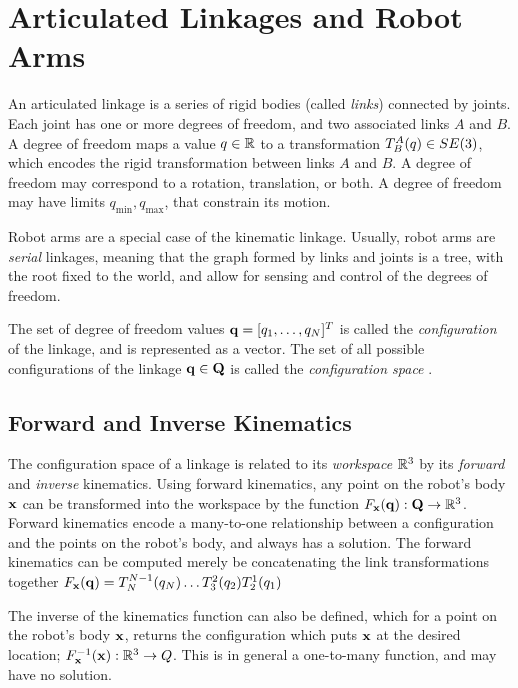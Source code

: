 \section{Articulated Linkages and Robot Arms}
\label{sec:articulated_linkage}
An articulated linkage is a series of rigid bodies (called \textit{links}) connected by joints. Each joint has one or more degrees of freedom, and two associated links $A$ and $B$. A degree of freedom maps a value $q \in \mathbb{R}$ to a transformation $T^{A}_B(q) \in SE(3)$, which encodes the rigid transformation between links $A$ and $B$. A degree of freedom may correspond to a rotation, translation, or both. A degree of freedom may have limits $q_\text{min}, q_\text{max}$, that constrain its motion.

Robot arms are a special case of the kinematic linkage. Usually, robot arms are \textit{serial} linkages, meaning that the graph formed by links and joints is a tree, with the root fixed to the world, and allow for sensing and control of the degrees of freedom.

The set of degree of freedom values $\mathbf{q} = [q_1, \ldots, q_N]^{T}$ is called the \textit{configuration} of the linkage, and is represented as a vector. The set of all possible configurations of the linkage $\mathbf{q} \in \mathbf{Q}$ is called the \textit{configuration space} \cite{Mason2001}. 


\subsection{Forward and Inverse Kinematics}
\label{sec:kinematics}
The configuration space of a linkage is related to its \textit{workspace} $\mathbb{R}^3$ by its \textit{forward} and \textit{inverse} kinematics. Using forward kinematics, any point on the robot's body $\mathbf{x}$ can be transformed into the workspace by the function $F_{\mathbf{x}}(\mathbf{q}) : \mathbf{Q} \to \mathbb{R}^3$. Forward kinematics encode a many-to-one relationship between a configuration and the points on the robot's body, and always has a solution. The forward kinematics can be computed merely be concatenating the link transformations together $F_{\mathbf{x}}(\mathbf{q}) = T^{N - 1}_{N}(q_N) \ldots T^{2}_3(q_2) T^{1}_2(q_1)$

The inverse of the kinematics function can also be defined, which for a point on the robot's body $\mathbf{x}$, returns the configuration which puts $\mathbf{x}$ at the desired location; $F_{\mathbf{x}}^{-1}(\mathbf{x}) : \mathbb{R}^3 \to Q$. This is in general a one-to-many function, and may have no solution.

